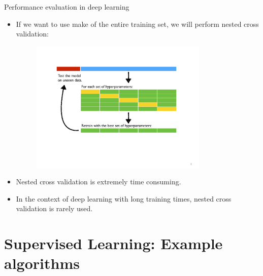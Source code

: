 \documentclass[xcolor=pdftex,dvipsnames,table]{beamer}
\begin{document}
\begin{frame}{Performance evaluation in deep learning}
	\begin{itemize}
		\item<1-> If we want to use make of the entire training set, we will perform nested cross validation:
 		\begin{figure}[htb]
 			\includegraphics[width=0.8\textwidth]{../graphics/NestedCrossValidation.pdf}
 		\end{figure}
		\item<2-> Nested cross validation is extremely time consuming.
		\item<3-> In the context of deep learning with long training times, nested cross validation is rarely used.
	\end{itemize}
\end{frame}



\section{Supervised Learning: Example algorithms}

\end{document}
